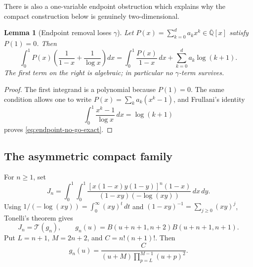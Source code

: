 \documentclass[11pt]{article}
\newtheorem{lemma}[theorem]{Lemma}
\theoremstyle{definition}
\theoremstyle{remark}
\newcommand{\Qbar}{\overline{\mathbb Q}}
\begin{document}
There is also a one-variable endpoint obstruction which explains why the
compact construction below is genuinely two-dimensional.

\begin{lemma}[Endpoint removal loses \(\gamma\)]
\label{lem:one-variable-endpoint-no-go}
Let \(P(x)=\sum_{k=0}^d a_kx^k\in\Qbar[x]\) satisfy \(P(1)=0\).  Then
\begin{equation}\label{eq:endpoint-no-go-exact}
 \int_0^1P(x)\left(\frac1{1-x}+\frac1{\log x}\right)dx
 =\int_0^1\frac{P(x)}{1-x}\,dx
  +\sum_{k=0}^da_k\log(k+1).
\end{equation}
The first term on the right is algebraic; in particular no \(\gamma\)-term
survives.
\end{lemma}

\begin{proof}
The first integrand is a polynomial because \(P(1)=0\).  The same condition
allows one to write \(P(x)=\sum_ka_k(x^k-1)\), and Frullani's identity
\[
 \int_0^1\frac{x^k-1}{\log x}\,dx=\log(k+1)
\]
proves \eqref{eq:endpoint-no-go-exact}.
\end{proof}

\subsection{The asymmetric compact family}

For \(n\ge1\), set
\begin{equation}\label{eq:asymmetric-Jn}
 J_n=\int_0^1\!\int_0^1
 \frac{[x(1-x)y(1-y)]^n(1-x)}
 {(1-xy)(-\log(xy))}\,dx\,dy.
\end{equation}
Using
\(1/(-\log(xy))=\int_0^\infty(xy)^t\,dt\) and
\((1-xy)^{-1}=\sum_{j\ge0}(xy)^j\), Tonelli's theorem gives
\begin{equation}\label{eq:Jn-floor-beta}
 J_n=\mathcal T(g_n),\qquad
 g_n(u)=B(u+n+1,n+2)B(u+n+1,n+1).
\end{equation}
Put \(L=n+1\), \(M=2n+2\), and \(C=n!(n+1)!\).  Then
\begin{equation}\label{eq:gn-rational-form}
 g_n(u)=\frac{C}{(u+M)\prod_{p=L}^{M-1}(u+p)^2}.
\end{equation}
\end{document}
